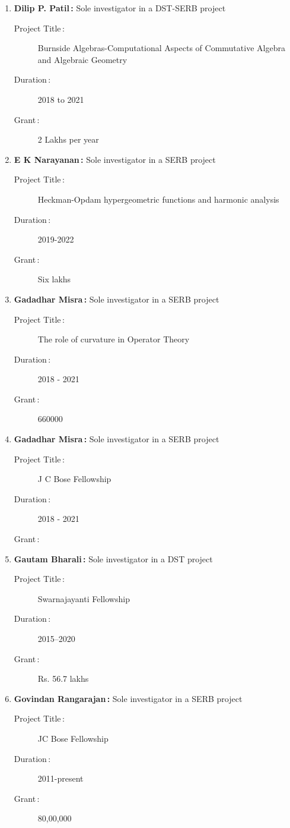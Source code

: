 \begin{enumerate}
\item {\bf Dilip P. Patil\,:} Sole investigator in a DST-SERB project
\begin{description}
  \item[Project Title\,:] Burnside Algebras-Computational Aspects of Commutative Algebra and Algebraic Geometry
  \item[Duration\,:] 2018 to 2021
  \item[Grant\,:] 2 Lakhs per year
\end{description}


\item {\bf E K Narayanan\,:} Sole investigator in a SERB project
\begin{description}
  \item[Project Title\,:] Heckman-Opdam hypergeometric functions and harmonic analysis
  \item[Duration\,:] 2019-2022
  \item[Grant\,:] Six lakhs
\end{description}


\item {\bf Gadadhar Misra\,:} Sole investigator in a SERB project
\begin{description}
  \item[Project Title\,:] The role of curvature in Operator Theory
  \item[Duration\,:] 2018 - 2021
  \item[Grant\,:] 660000
\end{description}


\item {\bf Gadadhar Misra\,:} Sole investigator in a SERB project
\begin{description}
  \item[Project Title\,:] J C Bose Fellowship
  \item[Duration\,:] 2018 - 2021
  \item[Grant\,:] 
\end{description}


\item {\bf Gautam Bharali\,:} Sole investigator in a DST project
\begin{description}
  \item[Project Title\,:] Swarnajayanti Fellowship
  \item[Duration\,:] 2015--2020
  \item[Grant\,:] Rs. 56.7 lakhs
\end{description}


\item {\bf Govindan Rangarajan\,:} Sole investigator in a SERB project
\begin{description}
  \item[Project Title\,:] JC Bose Fellowship
  \item[Duration\,:] 2011-present
  \item[Grant\,:] 80,00,000
\end{description}



\end{enumerate}
